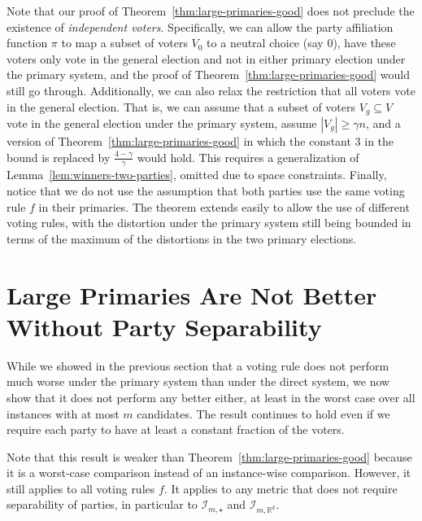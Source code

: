 \documentclass[letterpaper]{article} %
\theoremstyle{definition}
\newcommand{\bbR}{\mathbb{R}}
\newcommand{\calI}{\mathcal{I}}
\newcommand{\all}{\star}
\newcommand{\euc}[1]{\bbR^{#1}}
\newcommand{\I}{\calI}
\begin{document}
Note that our proof of Theorem~\ref{thm:large-primaries-good} does not preclude the existence of \emph{independent voters}. Specifically, we can allow the party affiliation function $\pi$ to map a subset of voters $V_0$ to a neutral choice (say $0$), have these voters only vote in the general election and not in either primary election under the primary system, and the proof of Theorem~\ref{thm:large-primaries-good} would still go through. Additionally, we can also relax the restriction that all voters vote in the general election. That is, we can assume that a subset of voters $V_g \subseteq V$ vote in the general election under the primary system, assume $|V_g| \ge \gamma n$, and a version of Theorem~\ref{thm:large-primaries-good} in which the constant $3$ in the bound is replaced by $\frac{4-\gamma}{\gamma}$ would hold. This requires a generalization of Lemma~\ref{lem:winners-two-parties}, omitted due to space constraints. Finally, notice that we do not use the assumption that both parties use the same voting rule $f$ in their primaries. The theorem extends easily to allow the use of different voting rules, with the distortion under the primary system still being bounded in terms of the maximum of the distortions in the two primary elections. 

\section{Large Primaries Are Not Better\\Without Party Separability}
\label{sec:large-primaries-not-better-all}

While we showed in the previous section that a voting rule does not perform much worse under the primary system than under the direct system, we now show that it does not perform any better either, at least in the worst case over all instances with at most $m$ candidates. The result continues to hold even if we require each party to have at least a constant fraction of the voters. 

Note that this result is weaker than Theorem~\ref{thm:large-primaries-good} because it is a worst-case comparison instead of an instance-wise comparison. However, it still applies to all voting rules $f$. It applies to any metric that does not require separability of parties, in particular to $\I_{m,\all}$ and $\I_{m,\euc{k}}$.
\end{document}
